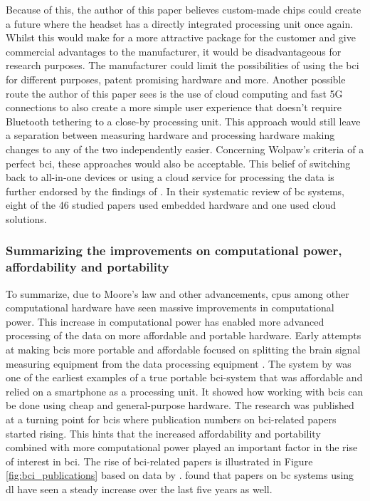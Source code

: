 Because of this, the author of this paper believes custom-made chips could create a future where the headset has a directly integrated processing unit once again.
Whilst this would make for a more attractive package for the customer and give commercial advantages to the manufacturer, it would be disadvantageous for research purposes.
The manufacturer could limit the possibilities of using the \gls{bci} for different purposes, patent promising hardware and more.
Another possible route the author of this paper sees is the use of cloud computing and fast 5G connections to also create a more simple user experience that doesn't require Bluetooth tethering to a close-by processing unit.
This approach would still leave a separation between measuring hardware and processing hardware making changes to any of the two independently easier.
Concerning Wolpaw's criteria of a perfect \gls{bci}, these approaches would also be acceptable.
This belief of switching back to all-in-one devices or using a cloud service for processing the data is further endorsed by the findings of \citet{bci_review_arnau}.
In their systematic review of \gls{bc} systems, eight of the 46 studied papers used embedded hardware and one used cloud solutions.


\subsubsection{Summarizing the improvements on computational power, affordability and portability}
\label{subsubsec:bci_gaining_popularity_better_processing_summary}

To summarize, due to Moore's law \citep{moores_law} and other advancements, \glspl{cpu} among other computational hardware have seen massive improvements in computational power.
This increase in computational power has enabled more advanced processing of the data on more affordable and portable hardware.
Early attempts at making \glspl{bci} more portable and affordable focused on splitting the brain signal measuring equipment from the data processing equipment \citep{early_bci_drowsiness, early_bci_multimedia}.
The system by \citet{early_bci_phone} was one of the earliest examples of a true portable \gls{bci}-system that was affordable and relied on a smartphone as a processing unit.
It showed how working with \glspl{bci} can be done using cheap and general-purpose hardware.
The research was published at a turning point for \glspl{bci} where publication numbers on \gls{bci}-related papers started rising.
This hints that the increased affordability and portability combined with more computational power played an important factor in the rise of interest in \gls{bci}. 
The rise of \gls{bci}-related papers is illustrated in Figure \ref{fig:bci_publications} based on data by \citet{bci_progress_overview}.
 found that papers on \gls{bc} systems using \gls{dl} have seen a steady increase over the last five years as well. 


